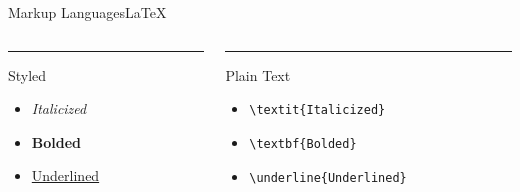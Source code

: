 \documentclass{beamer}
\begin{document}
\begin{frame}[fragile]{Markup Languages}{\LaTeX}

    \begin{columns}
    
    \begin{column}{0.48\textwidth}
    \color{red}\rule{\linewidth}{4pt}
    Styled
    \begin{itemize}
        \item \textit{Italicized}
        \item \textbf{Bolded}
        \item \underline{Underlined}
    \end{itemize}
    \end{column}
    
    \begin{column}{0.48\textwidth}
    \color{blue}\rule{\linewidth}{4pt}
    Plain Text
    \begin{itemize}
        \item \texttt{\textbackslash textit\{Italicized\}}
        \item \texttt{\textbackslash textbf\{Bolded\}} 
        \item \texttt{\textbackslash underline\{Underlined\}}
    \end{itemize}
    \end{column}
    
    \end{columns}

\end{frame}
\end{document}
